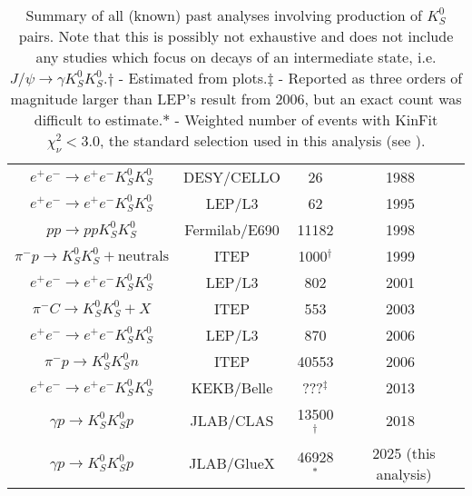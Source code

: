 \begin{table}
\begin{center}
\begin{tabular}{cccc}
$e^+e^- \to e^+e^- K_S^0 K_S^0$ & DESY/CELLO & 26 & 1988~\cite{Behrend1989}\\
$e^+e^- \to e^+e^- K_S^0 K_S^0$ & LEP/L3 & 62 & 1995~\cite{Acciarri1995}\\
$pp \to pp K_S^0 K_S^0$ & Fermilab/E690 & 11182 & 1998~\cite{Reyes1998}\\
$\pi^- p \to K_S^0 K_S^0 + \text{neutrals}$ & ITEP & 1000${}^\dagger$ & 1999~\cite{Barkov1999}\\
    $e^+e^- \to e^+e^- K_S^0 K_S^0$ & LEP/L3 & 802 & 2001~\cite{Acciarri2001}\\
  $\pi^- C \to K_S^0 K_S^0 + X$ & ITEP & 553 & 2003~\cite{Tikhomirov2003}\\
      $e^+e^- \to e^+e^- K_S^0 K_S^0$ & LEP/L3 & 870 & 2006~\cite{Schegelsky2006}\\
    $\pi^- p \to K_S^0 K_S^0 n$ & ITEP & 40553 & 2006~\cite{Vladimirsky2006}\\
    $e^+e^- \to e^+e^- K_S^0 K_S^0$ & KEKB/Belle & ???${}^\ddagger$ & 2013~\cite{Uehara2013}\\
    $\gamma p \to K_S^0 K_S^0 p$ & JLAB/CLAS & 13500${}^\dagger$ & 2018~\cite{Chandavar2018}\\
      $\gamma p \to K_S^0 K_S^0 p$ & JLAB/GlueX & 46928${}^\ast$ & 2025 (this analysis)\\\bottomrule
    \end{tabular}
    \caption{Summary of all (known) past analyses involving production of $K_S^0$ pairs. Note that this is possibly not exhaustive and does not include any studies which focus on decays of an intermediate state, i.e. $J/\psi \to \gamma K_S^0K_S^0$.\newline$\dagger$ - Estimated from plots.\newline$\ddagger$ - Reported as three orders of magnitude larger than LEP's result from 2006, but an exact count was difficult to estimate.\newline$\ast$ - Weighted number of events with KinFit $\chi^2_\nu < 3.0$, the standard selection used in this analysis (see ).}\label{tab:past-analyses}
  \end{center}
\end{table}
